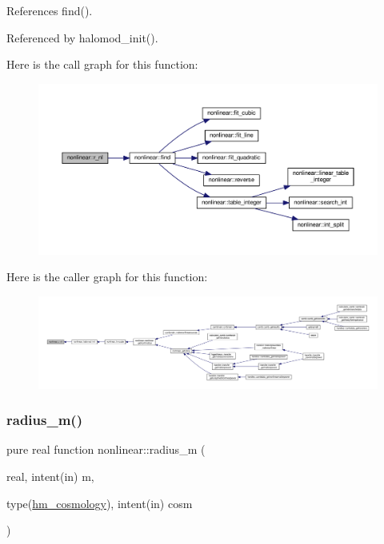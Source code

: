 References find().



Referenced by halomod\+\_\+init().

Here is the call graph for this function\+:
\nopagebreak
\begin{figure}[H]
\begin{center}
\leavevmode
\includegraphics[width=350pt]{namespacenonlinear_a9fdd5c2093c44b1f49fdaafaa3e568da_cgraph}
\end{center}
\end{figure}
Here is the caller graph for this function\+:
\nopagebreak
\begin{figure}[H]
\begin{center}
\leavevmode
\includegraphics[width=350pt]{namespacenonlinear_a9fdd5c2093c44b1f49fdaafaa3e568da_icgraph}
\end{center}
\end{figure}
\mbox{\label{namespacenonlinear_af71d6d6d99de458db1a669744d7b1088}} 
\subsubsection{\texorpdfstring{radius\+\_\+m()}{radius\_m()}}
{\footnotesize\ttfamily pure real function nonlinear\+::radius\+\_\+m (\begin{DoxyParamCaption}\item[{real, intent(in)}]{m,  }\item[{type(\mbox{\hyperlink{structnonlinear_1_1hm__cosmology}{hm\+\_\+cosmology}}), intent(in)}]{cosm }\end{DoxyParamCaption})\hspace{0.3cm}{\ttfamily [private]}}




